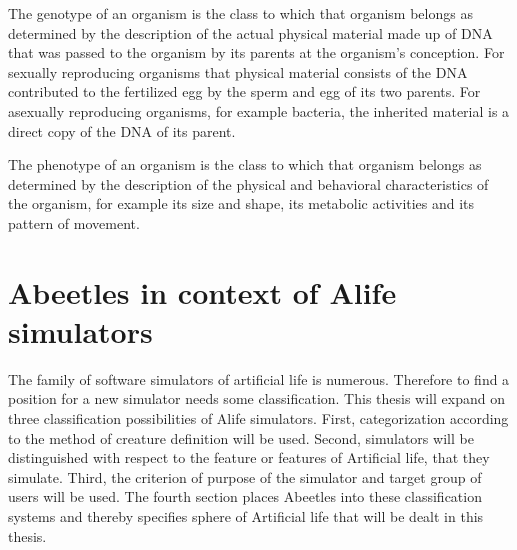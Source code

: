 \documentclass[a4paper,12pt]{report}
\begin{document}
The genotype of an organism is the class to which that organism belongs as determined by the description of the actual physical material made up of DNA that was passed to the organism by its parents at the organism's conception. For sexually reproducing organisms that physical material consists of the DNA contributed to the fertilized egg by the sperm and egg of its two parents. For asexually reproducing organisms, for example bacteria, the inherited material is a direct copy of the DNA of its parent. 

The phenotype of an organism is the class to which that organism belongs as determined by the description of the physical and behavioral characteristics of the organism, for example its size and shape, its metabolic activities and its pattern of movement.
\cite{GenPhen}



\chapter{Abeetles in context of Alife simulators} 
The family of software simulators of artificial life is numerous. Therefore to find a position for a new simulator needs some classification. This thesis will expand on three classification possibilities of Alife simulators. First, categorization according to the method of creature definition will be used. Second, simulators will be distinguished with respect to the feature or features of Artificial life, that they simulate. Third, the criterion of purpose of the simulator and target group of users will be used. The fourth section places Abeetles into these classification systems and thereby specifies sphere of Artificial life that will be dealt in this thesis.
\end{document}
